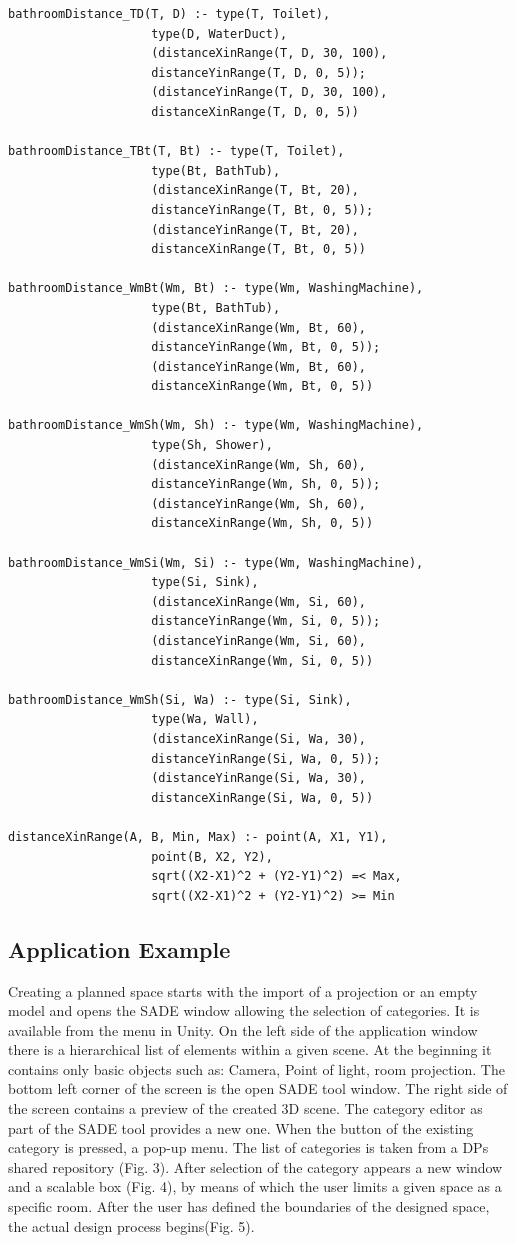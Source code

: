 \documentclass[runningheads]{llncs}
\begin{document}
\begin{verbatim}
bathroomDistance_TD(T, D) :- type(T, Toilet),
			        type(D, WaterDuct),
			        (distanceXinRange(T, D, 30, 100),
			        distanceYinRange(T, D, 0, 5));
			        (distanceYinRange(T, D, 30, 100),
			        distanceXinRange(T, D, 0, 5))
			      
bathroomDistance_TBt(T, Bt) :- type(T, Toilet),
			        type(Bt, BathTub),
			        (distanceXinRange(T, Bt, 20),
			        distanceYinRange(T, Bt, 0, 5));
			        (distanceYinRange(T, Bt, 20),
			        distanceXinRange(T, Bt, 0, 5))
			      
bathroomDistance_WmBt(Wm, Bt) :- type(Wm, WashingMachine),
			        type(Bt, BathTub),
			        (distanceXinRange(Wm, Bt, 60),
			        distanceYinRange(Wm, Bt, 0, 5));
			        (distanceYinRange(Wm, Bt, 60),
			        distanceXinRange(Wm, Bt, 0, 5))

bathroomDistance_WmSh(Wm, Sh) :- type(Wm, WashingMachine),
			        type(Sh, Shower),
			        (distanceXinRange(Wm, Sh, 60),
			        distanceYinRange(Wm, Sh, 0, 5));
			        (distanceYinRange(Wm, Sh, 60),
			        distanceXinRange(Wm, Sh, 0, 5))
			      
bathroomDistance_WmSi(Wm, Si) :- type(Wm, WashingMachine),
			        type(Si, Sink),
			        (distanceXinRange(Wm, Si, 60),
			        distanceYinRange(Wm, Si, 0, 5));
			        (distanceYinRange(Wm, Si, 60),
			        distanceXinRange(Wm, Si, 0, 5))	
			        
bathroomDistance_WmSh(Si, Wa) :- type(Si, Sink),
			        type(Wa, Wall),
			        (distanceXinRange(Si, Wa, 30),
			        distanceYinRange(Si, Wa, 0, 5));
			        (distanceYinRange(Si, Wa, 30),
			        distanceXinRange(Si, Wa, 0, 5))

distanceXinRange(A, B, Min, Max) :- point(A, X1, Y1),
				    point(B, X2, Y2),
				    sqrt((X2-X1)^2 + (Y2-Y1)^2) =< Max,
				    sqrt((X2-X1)^2 + (Y2-Y1)^2) >= Min
\end{verbatim}

\subsection{Application Example}
Creating a planned space starts with the import of a projection or an empty model and opens the SADE window allowing the selection of categories. It is available from the menu in Unity. On the left side of the application window there is a hierarchical list of elements within a given scene. At the beginning it contains only basic objects such as: Camera, Point of light, room projection. The bottom left corner of the screen is the open SADE tool window. The right side of the screen contains a preview of the created 3D scene. The category editor as part of the SADE tool provides a new one. When the button of the existing category is pressed, a pop-up menu. The list of categories is taken from a DPs shared repository (Fig. 3). After selection of the category appears a new window and a scalable box (Fig. 4), by means of which the user limits a given space as a specific room. After the user has defined the boundaries of the designed space, the actual design process begins(Fig. 5).
\end{document}

